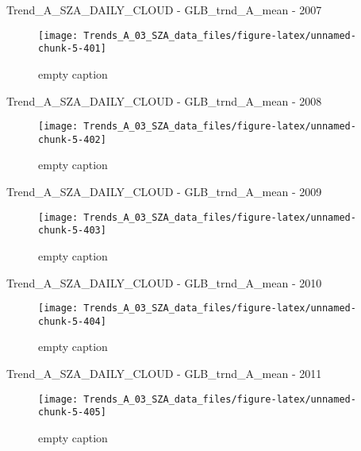 \documentclass[
  10pt,
  a4paper,oneside]{article}
\begin{document}
Trend\_A\_SZA\_DAILY\_CLOUD - GLB\_trnd\_A\_mean - 2007

\begin{figure}[!ht]

{\centering \texttt{[image: Trends\_A\_03\_SZA\_data\_files/figure-latex/unnamed-chunk-5-401]} 

}

\caption{ empty caption }\label{fig:unnamed-chunk-5-401}
\end{figure}

Trend\_A\_SZA\_DAILY\_CLOUD - GLB\_trnd\_A\_mean - 2008

\begin{figure}[!ht]

{\centering \texttt{[image: Trends\_A\_03\_SZA\_data\_files/figure-latex/unnamed-chunk-5-402]} 

}

\caption{ empty caption }\label{fig:unnamed-chunk-5-402}
\end{figure}

Trend\_A\_SZA\_DAILY\_CLOUD - GLB\_trnd\_A\_mean - 2009

\begin{figure}[!ht]

{\centering \texttt{[image: Trends\_A\_03\_SZA\_data\_files/figure-latex/unnamed-chunk-5-403]} 

}

\caption{ empty caption }\label{fig:unnamed-chunk-5-403}
\end{figure}

Trend\_A\_SZA\_DAILY\_CLOUD - GLB\_trnd\_A\_mean - 2010

\begin{figure}[!ht]

{\centering \texttt{[image: Trends\_A\_03\_SZA\_data\_files/figure-latex/unnamed-chunk-5-404]} 

}

\caption{ empty caption }\label{fig:unnamed-chunk-5-404}
\end{figure}

Trend\_A\_SZA\_DAILY\_CLOUD - GLB\_trnd\_A\_mean - 2011

\begin{figure}[!ht]

{\centering \texttt{[image: Trends\_A\_03\_SZA\_data\_files/figure-latex/unnamed-chunk-5-405]} 

}

\caption{ empty caption }\label{fig:unnamed-chunk-5-405}
\end{figure}
\end{document}
